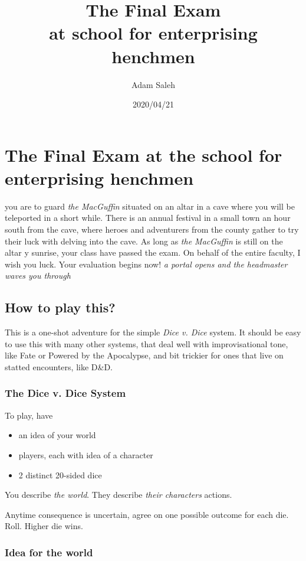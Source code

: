 \documentclass[letterpaper,twocolumn,openany,nodeprecatedcode]{dndbook}
\title{The Final Exam \\
\large at school for enterprising henchmen }
\author{Adam Saleh}
\date{2020/04/21}
\begin{document}
\mainmatter%

\section{The Final Exam at the school for enterprising henchmen}

 you are to guard \emph{the MacGuffin} situated on an altar in a cave where you will be teleported in a short while.
There is an annual festival in a small town an hour south from the cave, where heroes and adventurers from the county gather to try their luck with delving into the cave.
As long as \emph{the MacGuffin} is still on the altar y sunrise, your class have passed the exam. On behalf of the entire faculty, I wish you luck. Your evaluation begins now!
\emph{a portal opens and the headmaster waves you through}

\subsection{How to play this?}

This is a one-shot adventure for the simple \emph{Dice v. Dice} system.
It should be easy to use this with many other systems, that deal well with improvisational tone,
like Fate or Powered by the Apocalypse, and bit trickier for ones that live on statted encounters, like D\&D.


\subsubsection{The Dice v. Dice System}

{To play, have}
\begin{itemize}
  \item an idea of your world
  \item players, each with idea of a character
  \item 2 distinct 20-sided dice
\end{itemize}

You describe \emph{the world}. They describe \emph{their characters} actions.

Anytime consequence is uncertain, agree on one possible outcome for each die. Roll. Higher die wins.

\subsubsection{Idea for the world}
\end{document}
